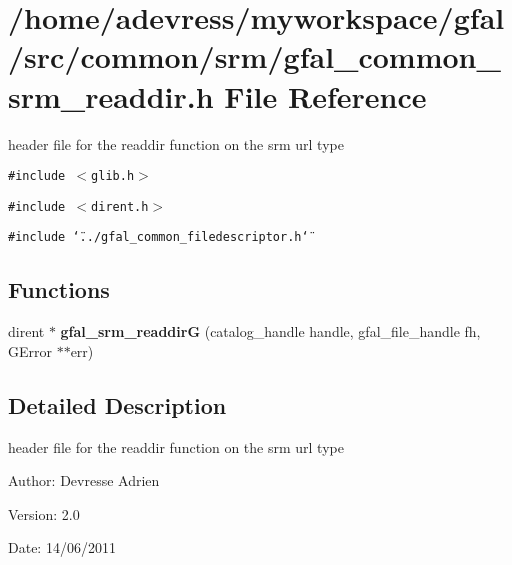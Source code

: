 \section{/home/adevress/myworkspace/gfal/src/common/srm/gfal\_\-common\_\-srm\_\-readdir.h File Reference}
\label{gfal__common__srm__readdir_8h}
header file for the readdir function on the srm url type 

{\tt \#include $<$glib.h$>$}\par
{\tt \#include $<$dirent.h$>$}\par
{\tt \#include \char`\"{}../gfal\_\-common\_\-filedescriptor.h\char`\"{}}\par
\subsection*{Functions}
\begin{CompactItemize}
\item 
dirent $\ast$ \textbf{gfal\_\-srm\_\-readdir\-G} (catalog\_\-handle handle, gfal\_\-file\_\-handle fh, GError $\ast$$\ast$err)\label{gfal__common__srm__readdir_8h_4ea39d54f0ac7e18351372cc212f76f5}

\end{CompactItemize}


\subsection{Detailed Description}
header file for the readdir function on the srm url type 

\begin{Desc}
\item[Author:]Devresse Adrien \end{Desc}
\begin{Desc}
\item[Version:]2.0 \end{Desc}
\begin{Desc}
\item[Date:]14/06/2011 \end{Desc}

